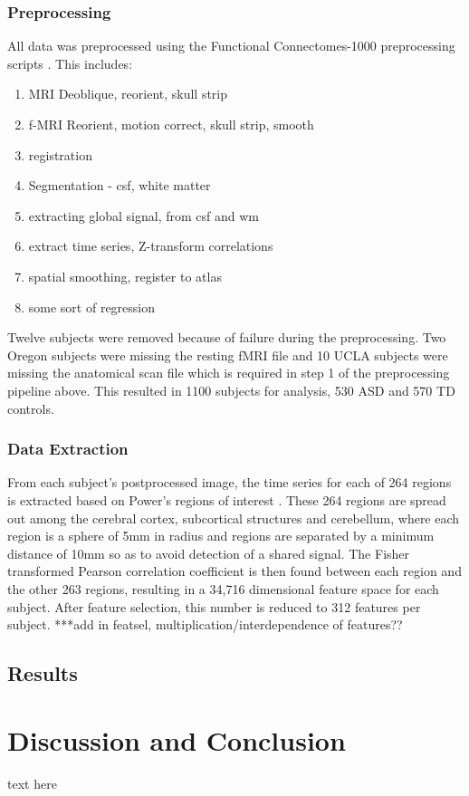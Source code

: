 \documentclass{llncs}
\begin{document}
\subsubsection{Preprocessing}
All data was preprocessed using the Functional Connectomes-1000 preprocessing scripts \cite{fcon}. This includes:
\begin{enumerate}
\item MRI Deoblique, reorient, skull strip
\item f-MRI Reorient, motion correct, skull strip, smooth
\item registration
\item Segmentation - csf, white matter
\item extracting global signal, from csf and wm
\item extract time series, Z-transform correlations
\item spatial smoothing, register to atlas
\item some sort of regression
\end{enumerate}
Twelve subjects were removed because of failure during the preprocessing.  Two Oregon subjects were missing the resting fMRI file and 10 UCLA subjects were missing the anatomical scan file which is required in step 1 of the preprocessing pipeline above. This resulted in 1100 subjects for analysis, 530 ASD and 570 TD controls.
\subsubsection{Data Extraction}
From each subject's postprocessed image, the time series for each of 264 regions is extracted based on Power's regions of interest \cite{Powers}. These 264 regions are spread out among the cerebral cortex, subcortical structures and cerebellum, where each region is a sphere of 5mm in radius and regions are separated by a minimum distance of 10mm so as to avoid detection of a shared signal. The Fisher transformed Pearson correlation coefficient is then found between each region and the other 263 regions, resulting in a 34,716 dimensional feature space for each subject. After feature selection, this number is reduced to 312 features per subject.
***add in featsel, multiplication/interdependence of features??
\subsection{Results}

\section{Discussion and Conclusion}
text here
\end{document}
